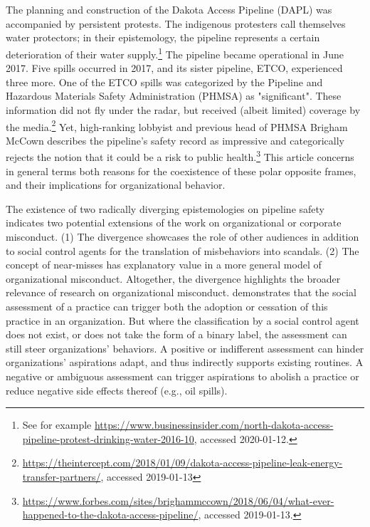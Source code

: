 \section{}

The planning and construction of the Dakota Access Pipeline (DAPL) was accompanied by persistent protests. The indigenous protesters call themselves water protectors; in their epistemology, the pipeline represents a certain deterioration of their water supply.\footnote{See for example \url{https://www.businessinsider.com/north-dakota-access-pipeline-protest-drinking-water-2016-10}, accessed 2020-01-12.} The pipeline became operational in June 2017. Five spills occurred in 2017, and its sister pipeline, ETCO, experienced three more. One of the ETCO spills was categorized by the Pipeline and Hazardous Materials Safety Administration (PHMSA) as "significant". These information did not fly under the radar, but received (albeit limited) coverage by the media.\footnote{\url{https://theintercept.com/2018/01/09/dakota-access-pipeline-leak-energy-transfer-partners/}, accessed 2019-01-13} Yet, high-ranking lobbyist and previous head of PHMSA Brigham McCown describes the pipeline's safety record as impressive and categorically rejects the notion that it could be a risk to public health.\footnote{\url{https://www.forbes.com/sites/brighammccown/2018/06/04/what-ever-happened-to-the-dakota-access-pipeline/}, accessed 2019-01-13.} This article concerns in general terms both reasons for the coexistence of these polar opposite frames, and their implications for organizational behavior.

The existence of two radically diverging epistemologies on pipeline safety indicates two potential extensions of the work on organizational or corporate misconduct. (1) The divergence showcases the role of other audiences in addition to social control agents \citep{Greve2010} for the translation of misbehaviors into scandals. (2) The concept of near-misses \citep{Carroll1998, Dillon2008} has explanatory value in a more general model of organizational misconduct. Altogether, the divergence highlights the broader relevance of research on organizational misconduct. \citet{Mohliver2019} demonstrates that the social assessment of a practice can trigger both the adoption or cessation of this practice in an organization. But where the classification by a social control agent does not exist, or does not take the form of a binary label, the assessment can still steer organizations' behaviors. A positive or indifferent assessment can hinder organizations' aspirations adapt, and thus indirectly supports existing routines. A negative or ambiguous assessment can trigger aspirations to abolish a practice or reduce negative side effects thereof (e.g., oil spills).

